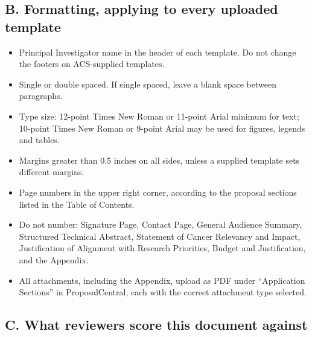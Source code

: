 \subsection*{B. Formatting, applying to every uploaded template}

\begin{itemize}
\item Principal Investigator name in the header of each template. Do not change
  the footers on ACS-supplied templates.
\item Single or double spaced. If single spaced, leave a blank space between
  paragraphs.
\item Type size: 12-point Times New Roman or 11-point Arial minimum for text;
  10-point Times New Roman or 9-point Arial may be used for figures, legends
  and tables.
\item Margins greater than 0.5 inches on all sides, unless a supplied template
  sets different margins.
\item Page numbers in the upper right corner, according to the proposal
  sections listed in the Table of Contents.
\item Do not number: Signature Page, Contact Page, General Audience Summary,
  Structured Technical Abstract, Statement of Cancer Relevancy and Impact,
  Justification of Alignment with Research Priorities, Budget and
  Justification, and the Appendix.
\item All attachments, including the Appendix, upload as PDF under
  ``Application Sections'' in ProposalCentral, each with the correct attachment
  type selected.
\end{itemize}

\subsection*{C. What reviewers score this document against}

